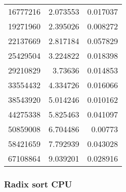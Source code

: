 \begin{longtable}{r r r}
16777216 & 2.073553 & 0.017037 \\
19271960 & 2.395026 & 0.008272 \\
22137669 & 2.817184 & 0.057829 \\
25429504 & 3.224822 & 0.018398 \\
29210829 & 3.73636 & 0.014853 \\
33554432 & 4.334726 & 0.016066 \\
38543920 & 5.014246 & 0.010162 \\
44275338 & 5.825463 & 0.041097 \\
50859008 & 6.704486 & 0.00773 \\
58421659 & 7.792939 & 0.043028 \\
67108864 & 9.039201 & 0.028916 \\
\end{longtable}

\subsubsection{Radix sort CPU}

